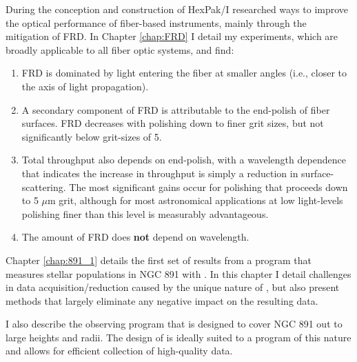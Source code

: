 During the conception and construction of HexPak/\GP I researched ways
to improve the optical performance of fiber-based instruments, mainly
through the mitigation of FRD. In Chapter \ref{chap:FRD} I detail my
experiments, which are broadly applicable to all fiber optic systems,
and find:
\begin{enumerate}

\item FRD is dominated by light entering the fiber at smaller angles
  (i.e., closer to the axis of light propagation).

\item A secondary component of FRD is attributable to the end-polish
  of fiber surfaces. FRD decreases with polishing down to finer grit
  sizes, but not significantly below grit-sizes of 5\mum.

\item Total throughput also depends on end-polish, with a wavelength
  dependence that indicates the increase in throughput is simply a
  reduction in surface-scattering.  The most significant gains occur
  for polishing that proceeds down to 5 $\mu$m grit, although for most
  astronomical applications at low light-levels polishing finer than
  this level is measurably advantageous.

\item The amount of FRD does \textbf{not} depend on wavelength.

\end{enumerate}

Chapter \ref{chap:891_1} details the first set of results from a
program that measures stellar populations in NGC 891 with \GP. In this
chapter I detail challenges in data acquisition/reduction caused by
the unique nature of \GP, but also present methods that largely
eliminate any negative impact on the resulting data.

I also describe the observing program that is designed to cover NGC
891 out to large heights and radii. The design of \GP is ideally
suited to a program of this nature and allows for efficient collection
of high-quality data.

